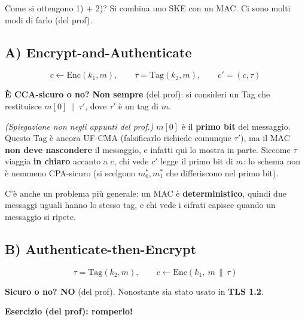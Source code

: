 Come si ottengono 1) + 2)? Si combina uno SKE con un MAC. Ci sono molti modi di farlo (del prof).

\subsection{A) Encrypt-and-Authenticate}

\[
c \leftarrow \text{Enc}(k_1, m), \qquad \tau = \text{Tag}(k_2, m), \qquad c' = (c, \tau)
\]

\textbf{È CCA-sicuro o no?} \textbf{Non sempre} (del prof): si consideri un Tag che restituisce \(m[0] \,\|\, \tau'\), dove \(\tau'\) è un tag di \(m\).

\begin{nota}
\emph{(Spiegazione non negli appunti del prof.)} \(m[0]\) è il \textbf{primo bit} del messaggio. Questo Tag è ancora UF-CMA (falsificarlo richiede comunque \(\tau'\)), ma il MAC \textbf{non deve nascondere} il messaggio, e infatti qui lo mostra in parte. Siccome \(\tau\) viaggia \textbf{in chiaro} accanto a \(c\), chi vede \(c'\) legge il primo bit di \(m\): lo schema non è nemmeno CPA-sicuro (si scelgono \(m_0^*, m_1^*\) che differiscono nel primo bit).

C'è anche un problema più generale: un MAC è \textbf{deterministico}, quindi due messaggi uguali hanno lo stesso tag, e chi vede i cifrati capisce quando un messaggio si ripete.
\end{nota}

\subsection{B) Authenticate-then-Encrypt}

\[
\tau = \text{Tag}(k_2, m), \qquad c \leftarrow \text{Enc}(k_1,\ m \,\|\, \tau)
\]

\textbf{Sicuro o no? NO} (del prof). Nonostante sia stato usato in \textbf{TLS 1.2}.

\textbf{Esercizio (del prof): romperlo!}

